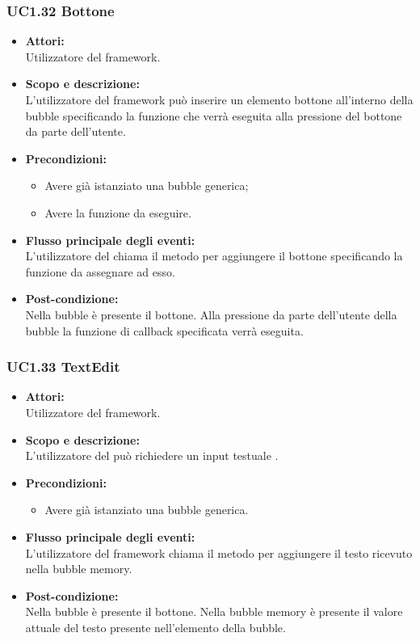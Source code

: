 \subsubsection{UC1.32 Bottone} \label{UC1.32}

\begin{itemize}
	\item \textbf{Attori:}
	\\Utilizzatore del framework.
	\item \textbf{Scopo e descrizione:} 
	\\L’utilizzatore del framework può inserire un elemento bottone all’interno della bubble specificando la funzione che verrà eseguita alla pressione del bottone da parte dell’utente.
	\item \textbf{Precondizioni:}
	\begin{itemize}
		\item Avere già istanziato una bubble generica;
		\item Avere la funzione da eseguire.
	\end{itemize}
	\item \textbf{Flusso principale degli eventi:}
	\\L’utilizzatore del  chiama il metodo per aggiungere il bottone specificando la funzione da assegnare ad esso.
	\item \textbf{Post-condizione:}
	\\Nella bubble è presente il bottone. Alla pressione da parte dell'utente della bubble la funzione di callback specificata verrà eseguita.
\end{itemize}

\subsubsection{UC1.33 TextEdit} \label{UC1.33}

\begin{itemize}
	\item \textbf{Attori:}
	\\Utilizzatore del framework.
	\item \textbf{Scopo e descrizione:} 
	\\L’utilizzatore del  può richiedere un input testuale .
	\item \textbf{Precondizioni:}
	\begin{itemize}
		\item Avere già istanziato una bubble generica.
	\end{itemize}
	\item \textbf{Flusso principale degli eventi:}
	\\L’utilizzatore del framework chiama il metodo per aggiungere il testo ricevuto nella bubble memory.
	\item \textbf{Post-condizione:}
	\\Nella bubble è presente il bottone. Nella bubble memory è presente il valore attuale del testo presente nell’elemento della bubble.
\end{itemize}

